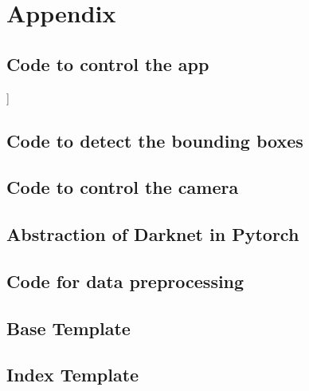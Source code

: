 \chapter{Appendix}

\section{Code to control the app}]\label{ap:app}


\section{Code to detect the bounding boxes}\label{ap:bbox}


\section{Code to control the camera}\label{ap:camera}


\section{Abstraction of Darknet in Pytorch}\label{ap:darknet}


\section{Code for data preprocessing}\label{ap:preprocess}


\section{Base Template}\label{ap:template1}


\section{Index Template}\label{ap:template2}







